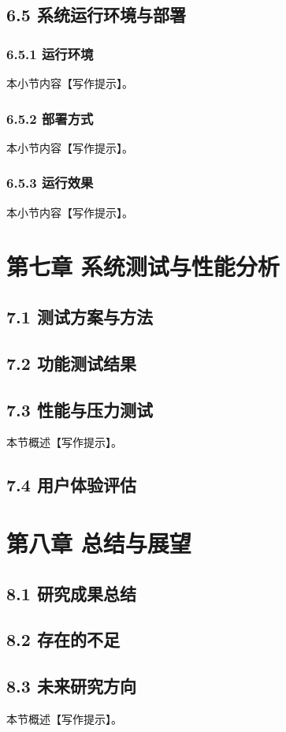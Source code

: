 \section{6.5 系统运行环境与部署}
\subsection{6.5.1 运行环境}
本小节内容【写作提示】。
\subsection{6.5.2 部署方式}
本小节内容【写作提示】。
\subsection{6.5.3 运行效果}
本小节内容【写作提示】。

\chapter{第七章 系统测试与性能分析}
\section{7.1 测试方案与方法}
\section{7.2 功能测试结果}
\section{7.3 性能与压力测试}
本节概述【写作提示】。\cite{schneckenburger_2018_nav_multipath}
\section{7.4 用户体验评估}

\chapter{第八章 总结与展望}
\section{8.1 研究成果总结}
\section{8.2 存在的不足}
\section{8.3 未来研究方向}
本节概述【写作提示】。\cite{FFI_SDA_Link16_Space_2023,Redwire_SDA_Ship_Demo_2024,JAPCC_F35_TDLs_2024,JAPCC_Hosted_Payloads_2015}
